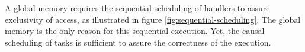 
\begin{figure}[h!]%
  \centering{}%
\end{figure}

A global memory requires the sequential scheduling of handlers to assure exclusivity of access, as illustrated in figure \ref{fig:sequential-scheduling}. %
The global memory is the only reason for this sequential execution.
Yet, the causal scheduling of tasks is sufficient to assure the correctness of the execution.


